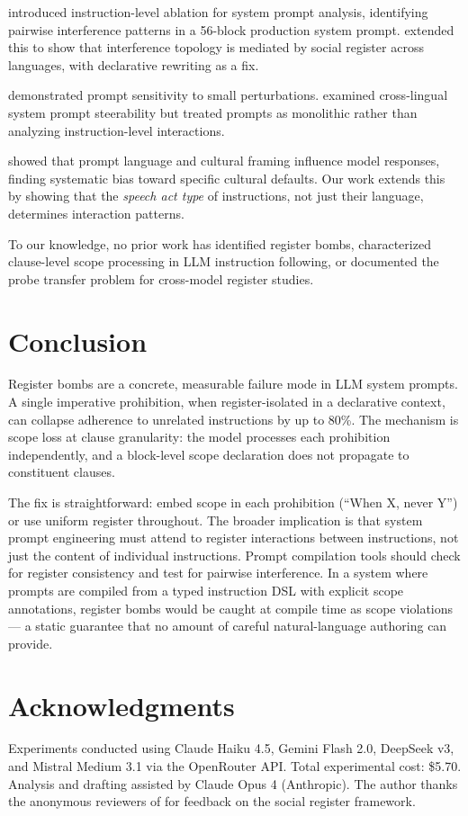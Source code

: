 \documentclass[11pt,a4paper]{article}
\begin{document}
\citet{mason2026arbiter} introduced instruction-level ablation for
system prompt analysis, identifying pairwise interference patterns
in a 56-block production system prompt. \citet{mason2026register}
extended this to show that interference topology is mediated by
social register across languages, with declarative rewriting as a fix.

\citet{prasad2025prompt} demonstrated prompt sensitivity to small
perturbations. \citet{zhang2025crosslingual} examined cross-lingual
system prompt steerability but treated prompts as monolithic rather
than analyzing instruction-level interactions.

\citet{bulte2025llms} showed that prompt language and cultural framing
influence model responses, finding systematic bias toward specific
cultural defaults. Our work extends this by showing that the
\emph{speech act type} of instructions, not just their language,
determines interaction patterns.

To our knowledge, no prior work has identified register bombs,
characterized clause-level scope processing in LLM instruction
following, or documented the probe transfer problem for cross-model
register studies.

\section{Conclusion}

Register bombs are a concrete, measurable failure mode in LLM system
prompts. A single imperative prohibition, when register-isolated in a
declarative context, can collapse adherence to unrelated instructions
by up to 80\%. The mechanism is scope loss at clause granularity: the
model processes each prohibition independently, and a block-level
scope declaration does not propagate to constituent clauses.

The fix is straightforward: embed scope in each prohibition
(``When X, never Y'') or use uniform register throughout. The broader
implication is that system prompt engineering must attend to register
interactions between instructions, not just the content of individual
instructions. Prompt compilation tools should check for register
consistency and test for pairwise interference. In a system where
prompts are compiled from a typed instruction DSL with explicit scope
annotations, register bombs would be caught at compile time as scope
violations --- a static guarantee that no amount of careful
natural-language authoring can provide.

\section*{Acknowledgments}

Experiments conducted using Claude Haiku 4.5, Gemini Flash 2.0,
DeepSeek v3, and Mistral Medium 3.1 via the OpenRouter API. Total
experimental cost: \$5.70. Analysis and drafting assisted by Claude
Opus 4 (Anthropic). The author thanks the anonymous reviewers of
\citet{mason2026register} for feedback on the social register
framework.


\end{document}
